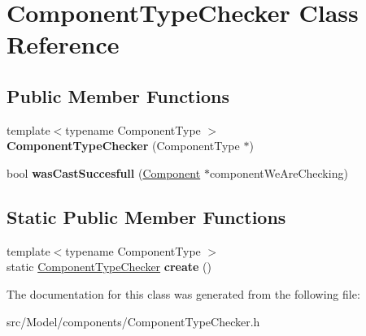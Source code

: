 \hypertarget{classComponentTypeChecker}{}\section{Component\+Type\+Checker Class Reference}
\label{classComponentTypeChecker}
\subsection*{Public Member Functions}
\begin{DoxyCompactItemize}
\item 
{\footnotesize template$<$typename Component\+Type $>$ }\\{\bfseries Component\+Type\+Checker} (Component\+Type $\ast$)\hypertarget{classComponentTypeChecker_adb04cf1c48a7e335146addc072fba1f9}{}\label{classComponentTypeChecker_adb04cf1c48a7e335146addc072fba1f9}

\item 
bool {\bfseries was\+Cast\+Succesfull} (\hyperlink{classComponent}{Component} $\ast$component\+We\+Are\+Checking)\hypertarget{classComponentTypeChecker_ae950a7cc04452b3f2a96542febce5eb8}{}\label{classComponentTypeChecker_ae950a7cc04452b3f2a96542febce5eb8}

\end{DoxyCompactItemize}
\subsection*{Static Public Member Functions}
\begin{DoxyCompactItemize}
\item 
{\footnotesize template$<$typename Component\+Type $>$ }\\static \hyperlink{classComponentTypeChecker}{Component\+Type\+Checker} {\bfseries create} ()\hypertarget{classComponentTypeChecker_ae96c2f4ba47734b47b2735c18696be44}{}\label{classComponentTypeChecker_ae96c2f4ba47734b47b2735c18696be44}

\end{DoxyCompactItemize}


The documentation for this class was generated from the following file\+:\begin{DoxyCompactItemize}
\item 
src/\+Model/components/Component\+Type\+Checker.\+h\end{DoxyCompactItemize}
